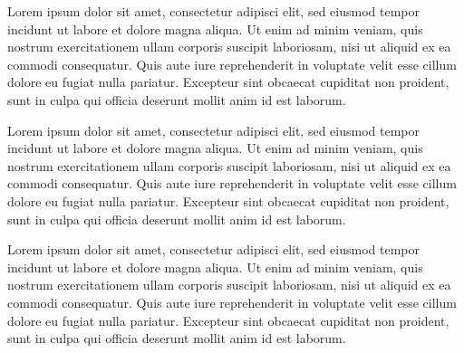 Lorem ipsum dolor sit amet, consectetur adipisci elit, sed eiusmod tempor
incidunt ut labore et dolore magna aliqua. Ut enim ad minim veniam, quis
nostrum exercitationem ullam corporis suscipit laboriosam, nisi ut aliquid ex
ea commodi consequatur. Quis aute iure reprehenderit in voluptate velit esse
cillum dolore eu fugiat nulla pariatur. Excepteur sint obcaecat cupiditat non
proident, sunt in culpa qui officia deserunt mollit anim id est laborum.

Lorem ipsum dolor sit amet, consectetur adipisci elit, sed eiusmod tempor
incidunt ut labore et dolore magna aliqua. Ut enim ad minim veniam, quis
nostrum exercitationem ullam corporis suscipit laboriosam, nisi ut aliquid ex
ea commodi consequatur. Quis aute iure reprehenderit in voluptate velit esse
cillum dolore eu fugiat nulla pariatur. Excepteur sint obcaecat cupiditat non
proident, sunt in culpa qui officia deserunt mollit anim id est laborum.

Lorem ipsum dolor sit amet, consectetur adipisci elit, sed eiusmod tempor
incidunt ut labore et dolore magna aliqua. Ut enim ad minim veniam, quis
nostrum exercitationem ullam corporis suscipit laboriosam, nisi ut aliquid ex
ea commodi consequatur. Quis aute iure reprehenderit in voluptate velit esse
cillum dolore eu fugiat nulla pariatur. Excepteur sint obcaecat cupiditat non
proident, sunt in culpa qui officia deserunt mollit anim id est laborum.
